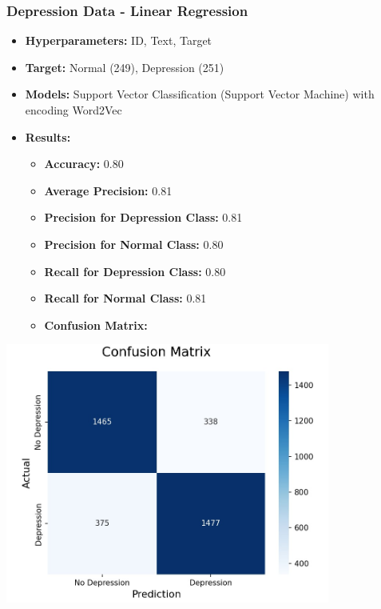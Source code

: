 \documentclass[a4paper,12pt]{article}
\begin{document}
\vspace{0.5cm} %

\subsubsection{Depression Data - Linear Regression}
\begin{itemize}
    \item \textbf{Hyperparameters:} ID, Text, Target
    \item \textbf{Target:} Normal (249), Depression (251)
    \item \textbf{Models:} Support Vector Classification (Support Vector Machine) with encoding Word2Vec
    \item \textbf{Results:}
    \begin{itemize}
        \item \textbf{Accuracy:} 0.80
        \item \textbf{Average Precision:} 0.81
        \item \textbf{Precision for Depression Class:} 0.81
        \item \textbf{Precision for Normal Class:} 0.80
        \item \textbf{Recall for Depression Class:} 0.80
        \item \textbf{Recall for Normal Class:} 0.81
        \item \textbf{Confusion Matrix:}
    \end{itemize}
\end{itemize}

\begin{center}
    \includegraphics[width=0.8\textwidth]{Depression-Data-LinearRegression.jpg} %
\end{center}
\end{document}
